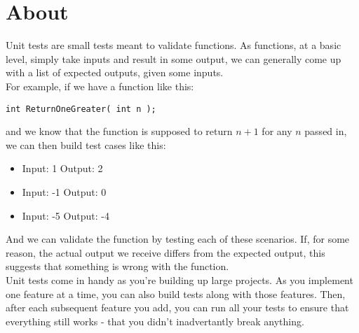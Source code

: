 
\newcommand{\laClass}       {CS 250}
\newcommand{\laSemester}    {Spring 2018}
\newcommand{\laChapter}     {}
\newcommand{\laType}        {Lab}
\newcommand{\laAssignment}  {}
\newcommand{\laPoints}      {5}
\newcommand{\laTitle}       {Unit Tests}
\newcommand{\laStarterFiles}{Download from GitHub.}
\newcommand{\laTopics}      {Designing and implementing unit tests}
\setcounter{chapter}{1}
\setcounter{section}{1}
\addtocounter{section}{-1}
\toggletrue{answerkey}
\togglefalse{answerkey}




\section{About}

Unit tests are small tests meant to validate functions. As functions,
at a basic level, simply take inputs and result in some output, we can
generally come up with a list of expected outputs, given some inputs.
~\\

For example, if we have a function like this:

\begin{center}
    \texttt{int ReturnOneGreater( int n );}
\end{center}

and we know that the function is supposed to return $n+1$ for any $n$ passed in,
we can then build test cases like this:

\begin{itemize}
    \item   Input: 1    \tab     Output: 2
    \item   Input: -1   \tab     Output: 0
    \item   Input: -5   \tab     Output: -4
\end{itemize}

And we can validate the function by testing each of these scenarios. If, for some reason,
the actual output we receive differs from the expected output, this suggests that something
is wrong with the function. ~\\

Unit tests come in handy as you're building up large projects. As you implement one feature at a time,
you can also build tests along with those features. Then, after each subsequent feature you add,
you can run all your tests to ensure that everything still works - that you didn't inadvertantly break anything.

